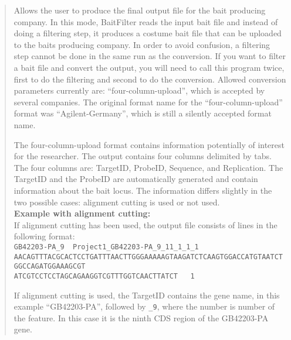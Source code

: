 \documentclass[a4paper,pdflatex,11pt]{article}
\begin{document}
\begin{quote}
Allows the user to produce the final output file for the bait producing
company. In this mode, BaitFilter reads the input bait file and instead
of doing a filtering step, it produces a costume bait file that can be
uploaded to the baits producing company. In order to avoid confusion, a
filtering step cannot be done in the same run as the conversion. If you
want to filter a bait file and convert the output, you will need to call
this program twice, first to do the filtering and second to do the
conversion. Allowed conversion parameters currently are: ``four-column-upload'',
which is accepted by several companies. The original format name for the 
``four-column-upload'' format was ``Agilent-Germany'', which is still a silently accepted
format name.

The four-column-upload format contains information potentially of interest for the researcher.
The output contains four columns delimited by tabs. The four columns are: TargetID, ProbeID, Sequence, and Replication.
The TargetID and the ProbeID are automatically generated and contain information about the bait locus.
The information differs slightly in the two possible cases: alignment cutting is used or not used.\\

{\bf Example with alignment cutting:}\\

If alignment cutting has been used, the output file consists of lines in the following format:\\
{
\tiny
\verb+GB42203-PA_9	Project1_GB42203-PA_9_11_1_1_1 AACAGTTTACGCACTCCTGATTTAACTTGGGAAAAAGTAAGATCTCAAGTGGACCATGTAATCTGGCCAGATGGAAAGCGT+\\[-1mm]
\verb+ATCGTCCTCCTAGCAGAAGGTCGTTTGGTCAACTTATCT	1+
}

If alignment cutting is used, the TargetID contains the gene name, in this example ``GB42203-PA'', followed by \verb+_9+, where
the number is number of the feature. In this case it is the ninth CDS region of the GB42203-PA gene.



\end{quote}
\end{document}
